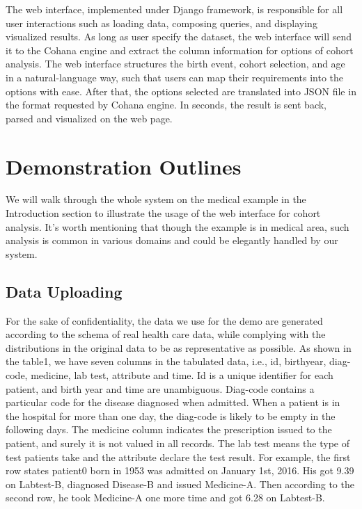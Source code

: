 \documentclass[10pt,conference,letterpaper]{IEEEtran}
\begin{document}
The web interface, implemented under Django framework, is responsible for all user interactions such as loading data, composing queries, and displaying visualized results. As long as user specify the dataset, the web interface will send it to the Cohana engine and extract the column information for options of cohort analysis. The web interface structures the birth event, cohort selection, and age in a natural-language way, such that users can map their requirements into the options with ease. After that, the options selected are translated into JSON file in the format requested by Cohana engine. In seconds, the result is sent back, parsed and visualized on the web page.

\section{Demonstration Outlines}

We will walk through the whole system on the medical example in the Introduction section to illustrate the usage of the web interface for cohort analysis. It's worth mentioning that though the example is in medical area, such analysis is common in various domains and could be elegantly handled by our system.

\subsection{Data Uploading}

For the sake of confidentiality, the data we use for the demo are generated according to the schema of real health care data, while complying with the distributions in the original data to be as representative as possible. As shown in the table1, we have seven columns in the tabulated data, i.e., id, birthyear, diag-code, medicine, lab test, attribute and time. Id is a unique identifier for each patient, and birth year and time are unambiguous. Diag-code contains a particular code for the disease diagnosed when admitted. When a patient is in the hospital for more than one day, the diag-code is likely to be empty in the following days. The medicine column indicates the prescription issued to the patient, and surely it is not valued in all records. The lab test means the type of test patients take and the attribute declare the test result. For example, the first row states patient0 born in 1953 was admitted on January 1st, 2016. His got 9.39 on Labtest-B, diagnosed Disease-B and issued Medicine-A. Then according to the second row, he took Medicine-A one more time and got 6.28 on Labtest-B.
\end{document}
